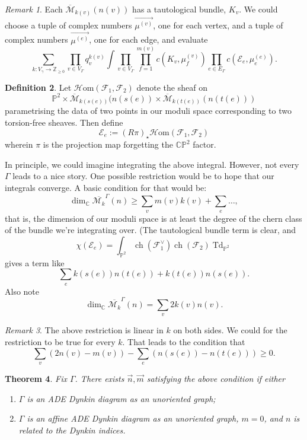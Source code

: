 \documentclass[leqno, openany]{memoir}
\newtheorem{thm}{Theorem}[section]
\theoremstyle{definition}
\newtheorem{defn}[thm]{Definition}
\theoremstyle{remark}
\newtheorem{rmk}[thm]{Remark}
\theoremstyle{plain}
\theoremstyle{definition}
\theoremstyle{remark}
\newcommand{\mr}[1]{\mathrm{#1}}
\newcommand{\on}[1]{\operatorname{#1}}
\begin{document}
\begin{rmk}
  Each $\overline{\mathcal{M}}_{k(v)}(n(v))$ has a tautological bundle, $K_v$. 
We could choose a tuple of complex numbers $\vec{\mu^{(v)}}$, one for each vertex,
and a tuple of complex numbers $\vec{\mu^{(e)}}$, one for each edge, and evaluate 
\[
\sum_{k : V_\gamma \to \mathbb{Z}_{\geq 0}} \prod_{v \in V_\Gamma} q_v^{k(v)}\int \prod_{v \in V_\Gamma} \prod_{f = 1}^{m(v)} c(K_v, \mu_f^{(v)}) \prod_{e \in E_\Gamma} c(\mathcal{E}_e, \mu^{(e)}_e).
\]
\end{rmk} 

\begin{defn}
Let $\mathcal{H}\mr{om}(\mathcal{F}_1,\mathcal{F}_2)$ denote the sheaf on 
\[
\mathbb{P}^2 \times \overline{\mathcal{M}}_{k(s(e))}(n(s(e)) \times \overline{\mathcal{M}}_{k(t(e))}(n(t(e)))
\]
parametrising the data of two points in our moduli space corresponding to two torsion-free sheaves. 
Then define 
\[
\mathcal{E}_e := (R\pi)_\star \mathcal{H}\mr{om}(\mathcal{F}_1,\mathcal{F}_2)
\]
wherein $\pi$ is the projection map forgetting the $\mathbb{CP}^2$ factor. 
\end{defn} 

In principle, we could imagine integrating the above integral. However, not every $\Gamma$ leads to a nice story. 
One possible restriction would be to hope that our integrals converge. A basic condition for that would be:
\[
\dim_{\mathbb{C}} \overline{\mathcal{M}_k}^\Gamma(n) \geq \sum_v m(v) k(v) + \sum_e \dots,
\]
that is, the dimension of our moduli space is at least the degree of the chern class of the bundle we're integrating over. 
(The tautological bundle term is clear, and 
\[
\chi(\mathcal{E}_e) = \int_{\mathbb{P}^2} \on{ch}(\mathcal{F}_1^\vee) \on{ch}(\mathcal{F}_2) \on{Td}_{\mathbb{P}^2}
\]
gives a term like 
\[
\sum_e k(s(e))n(t(e)) + k(t(e)) n(s(e)).
\]
Also note 
\[
\dim_{\mathbb{C}} \overline{\mathcal{M}_k}^\Gamma(n) = \sum_v 2k(v)n(v).
\]

\begin{rmk}
The above restriction is linear in $k$ on both sides. We could for the 
restriction to be true for every $k$. 
That leads to the condition that 
\[
\sum_v (2n(v) - m(v)) - \sum_e (n(s(e)) - n(t(e)) )\geq 0.
\]
\end{rmk}

\begin{thm}
Fix $\Gamma$. There exists $\vec{n}, \vec{m}$ satisfying the 
above condition if either 
\begin{enumerate}
\item $\Gamma$ is an ADE Dynkin diagram as an unoriented graph;
\item $\Gamma$ is an affine ADE Dynkin diagram as an unoriented graph, $m = 0$, and $n$ is related to the Dynkin indices.
\end{enumerate}
\end{thm}
\end{document}
